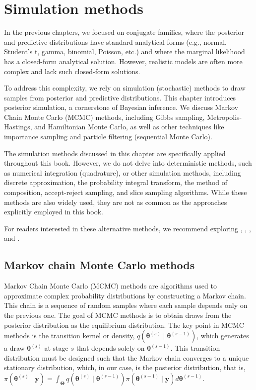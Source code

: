 \chapter{Simulation methods}\label{chap5}

In the previous chapters, we focused on conjugate families, where the posterior and predictive distributions have standard analytical forms (e.g., normal, Student's t, gamma, binomial, Poisson, etc.) and where the marginal likelihood has a closed-form analytical solution. However, realistic models are often more complex and lack such closed-form solutions.

To address this complexity, we rely on simulation (stochastic) methods to draw samples from posterior and predictive distributions. This chapter introduces posterior simulation, a cornerstone of Bayesian inference. We discuss Markov Chain Monte Carlo (MCMC) methods, including Gibbs sampling, Metropolis-Hastings, and Hamiltonian Monte Carlo, as well as other techniques like importance sampling and particle filtering (sequential Monte Carlo).

The simulation methods discussed in this chapter are specifically applied throughout this book. However, we do not delve into deterministic methods, such as numerical integration (quadrature), or other simulation methods, including discrete approximation, the probability integral transform, the method of composition, accept-reject sampling, and slice sampling algorithms. While these methods are also widely used, they are not as common as the approaches explicitly employed in this book.

For readers interested in these alternative methods, we recommend exploring \cite[Chaps.~2 and 3]{robert2010introducing}, \cite[Chaps.~2, 3, and 8]{robert2011monte}, \cite[Chap.~5]{greenberg2012introduction}, and \cite[Chap.~10]{gelman2021bayesian}.

\section{Markov chain Monte Carlo methods}\label{sec51}

Markov Chain Monte Carlo (MCMC) methods are algorithms used to approximate complex probability distributions by constructing a Markov chain. This chain is a sequence of random samples where each sample depends only on the previous one. The goal of MCMC methods is to obtain draws from the posterior distribution as the equilibrium distribution. The key point in MCMC methods is the transition kernel or density, $q(\bm{\theta}^{(s)}\mid \bm{\theta}^{(s-1)})$, which generates a draw $\bm{\theta}^{(s)}$ at stage $s$ that depends solely on $\bm{\theta}^{(s-1)}$. This transition distribution must be designed such that the Markov chain converges to a unique stationary distribution, which, in our case, is the posterior distribution, that is, $\pi(\bm{\theta}^{(s)}\mid \bm{y})=\int_{\bm{\Theta}}q(\bm{\theta}^{(s)}\mid \bm{\theta}^{(s-1)})\pi(\bm{\theta}^{(s-1)}\mid \bm{y})d\bm{\theta}^{(s-1)}$.

